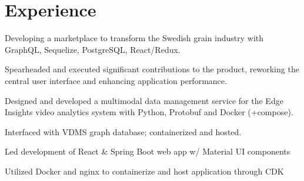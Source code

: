 \documentclass[letterpaper]{cv} %
\begin{document}
\begin{minipage}[t]{0.66\textwidth} %

  \section{Experience}
  \vspace{\topsep} %
  \begin{tightitemize}
    \item Developing a marketplace to transform the Swedish grain industry with GraphQL, Sequelize, PostgreSQL, React/Redux.
    \item Spearheaded and executed significant contributions to the product, reworking the central user interface and enhancing application performance.
  \end{tightitemize}
  \sectionspace

  \begin{tightitemize}
    \item Designed and developed a multimodal data management service for the Edge Insights video analytics system with Python, Protobuf and Docker (+compose).
    \item Interfaced with VDMS graph database; containerized and hosted.
  \end{tightitemize}
  \sectionspace


  \begin{tightitemize}
    \item Led development of React \& Spring Boot web app w/ Material UI components
    \item Utilized Docker and nginx to containerize and host application through CDK
  \end{tightitemize}
  \sectionspace



\end{minipage}
\end{document}
